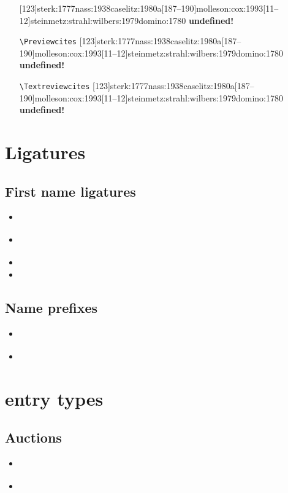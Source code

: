 \documentclass[a4paper,12pt]{scrartcl}
\newcommand*{\Befehl}[1]{\texttt{\textbackslash#1}}
\begin{document}
\begin{enumerate}
        {[123]{sterk:1777}{nass:1938}{caselitz:1980a}[187--190]{molleson:cox:1993}[11--12]{steinmetz:strahl:wilbers:1979}{domino:1780}}
        {\textbf{undefined!}}%
	\item[\footnotesize\Befehl{Previewcites}] 
        {[123]{sterk:1777}{nass:1938}{caselitz:1980a}[187--190]{molleson:cox:1993}[11--12]{steinmetz:strahl:wilbers:1979}{domino:1780}}
        {\textbf{undefined!}}%
	\item[\footnotesize\Befehl{Textreviewcites}] 
        {[123]{sterk:1777}{nass:1938}{caselitz:1980a}[187--190]{molleson:cox:1993}[11--12]{steinmetz:strahl:wilbers:1979}{domino:1780}}
        {\textbf{undefined!}}%
\end{enumerate}


\section{Ligatures}

\subsection{First name ligatures}
\begin{itemize}
    \item\cite{test::firstnames::2}%
    \item\cite{test::firstnames::1}%
    \item{}%
    \item{}%
\end{itemize}

\subsection{Name prefixes}
\begin{itemize}
    \item\cite{test::prefixnames::1}%
    \item{}%
\end{itemize}

\section{entry types}

\subsection{Auctions}
\begin{itemize}
    \item\cite{hesse:c:1995}%
    \item{}
\end{itemize}
\end{document}
